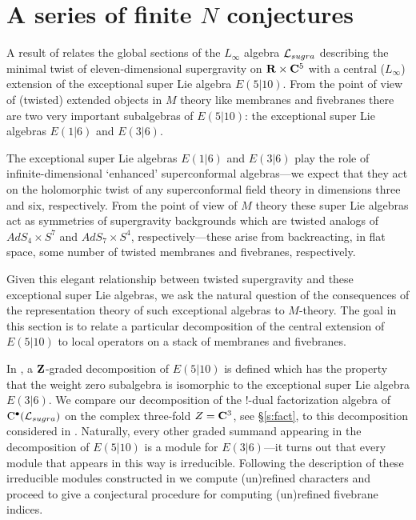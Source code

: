 %
%
%

\section{A series of finite $N$ conjectures}
\label{s:kr}

A result of \cite{RSW} relates the global sections of the $L_\infty$ algebra $\mathcal L_{sugra}$ describing the minimal twist of eleven-dimensional supergravity on $\mathbf{R} \times \mathbf{C}^5$ with a central ($L_\infty$) extension of the exceptional super Lie algebra $E(5|10)$.
From the point of view of (twisted) extended objects in $M$ theory like membranes and fivebranes there are two very important subalgebras of $E(5|10)$: the exceptional super Lie algebras $E(1|6)$ and $E(3|6)$. 

The exceptional super Lie algebras $E(1|6)$ and $E(3|6)$ play the role of infinite-dimensional `enhanced' superconformal algebras---we expect that they act on the holomorphic twist of any superconformal field theory in dimensions three and six, respectively.
From the point of view of $M$ theory these super Lie algebras act as symmetries of supergravity backgrounds which are twisted analogs of $AdS_4 \times S^7$ and $AdS_7 \times S^4$, respectively---these arise from backreacting, in flat space, some number of twisted membranes and fivebranes, respectively. 

Given this elegant relationship between twisted supergravity and these exceptional super Lie algebras, we ask the natural question of the consequences of the representation theory of such exceptional algebras to $M$-theory. 
The goal in this section is to relate a particular decomposition of the central extension of $E(5|10)$ to local operators on a stack of membranes and fivebranes.

In \cite{KR2}, a $\mathbf{Z}$-graded decomposition of $E(5|10)$ is defined which has the property that the weight zero subalgebra is isomorphic to the exceptional super Lie algebra $E(3|6)$.
We compare our decomposition of the $!$-dual factorization algebra of ${\rm C}^\bullet(\mathcal L_{sugra})$ on the complex three-fold $Z = \mathbf{C}^3$, see \S \ref{s:fact}, to this decomposition considered in \cite{KR2}.
Naturally, every other graded summand appearing in the decomposition of $E(5|10)$ is a module for $E(3|6)$---it turns out that every module that appears in this way is irreducible.
Following the description of these irreducible modules constructed in \cite{KR1,KR2} we compute (un)refined characters and proceed to give a conjectural procedure for computing (un)refined fivebrane indices.

